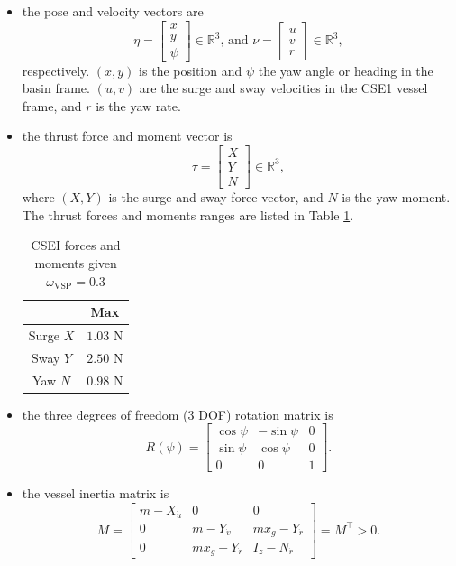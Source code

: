 \begin{itemize}
	\item the pose and velocity vectors are
	\[
	\eta=\left[\begin{array}{c}
	x\\
	y\\
	\psi
	\end{array}\right]\in\mathbb{R}^{3}\text{, and }\nu=\left[\begin{array}{c}
	u\\
	v\\
	r
	\end{array}\right]\in\mathbb{R}^{3},
	\]
	respectively. $\left(x,y\right)$ is the position and $\psi$ the
	yaw angle or heading in the basin frame. $\left(u,v\right)$ are the
	surge and sway velocities in the CSE1 vessel frame, and $r$ is the
	yaw rate.
	\item the thrust force and moment vector is
	\[
	\tau=\left[\begin{array}{c}
	X\\
	Y\\
	N
	\end{array}\right]\in\mathbb{R}^{3},
	\]
	where $\left(X,Y\right)$ is the surge and sway force vector, and
	$N$ is the yaw moment. The thrust forces and moments ranges are listed
	in Table \ref{tab: CSEI Thust Moment}.
	\begin{table}
		\begin{centering}
			\begin{tabular}{cc}
				& Max\tabularnewline
				\midrule 
				Surge $X$  & $1.03$ N\tabularnewline
				Sway $Y$  & $2.50$ N\tabularnewline
				Yaw $N$  & $0.98$ N\tabularnewline
				\bottomrule
			\end{tabular}
			\par\end{centering}
		\caption{\label{tab: CSEI Thust Moment}CSEI forces and moments given $\omega_{\text{VSP}}=0.3$}
	\end{table}
	\item the three degrees of freedom (3 DOF) rotation matrix is
	\[
	R\left(\psi\right)=\left[\begin{array}{ccc}
	\cos\psi & -\sin\psi & 0\\
	\sin\psi & \cos\psi & 0\\
	0 & 0 & 1
	\end{array}\right].
	\]
	\item the vessel inertia matrix is
	\[
	M=\left[\begin{array}{ccc}
	m-X_{\dot{u}} & 0 & 0\\
	0 & m-Y_{\dot{v}} & mx_{g}-Y_{\dot{r}}\\
	0 & mx_{g}-Y_{\dot{r}} & I_{z}-N_{\dot{r}}
	\end{array}\right]=M^{\top}>0.
	\]
	

\end{itemize}
